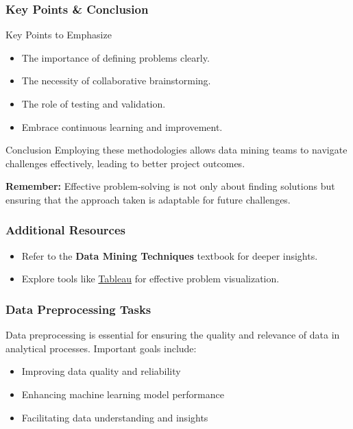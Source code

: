 \documentclass{beamer}
\begin{document}
\begin{frame}[fragile]
    \frametitle{Key Points & Conclusion}
    \begin{block}{Key Points to Emphasize}
        \begin{itemize}
            \item The importance of defining problems clearly.
            \item The necessity of collaborative brainstorming.
            \item The role of testing and validation.
            \item Embrace continuous learning and improvement.
        \end{itemize}
    \end{block}

    \begin{block}{Conclusion}
        Employing these methodologies allows data mining teams to navigate challenges effectively, leading to better project outcomes.
        
        \textbf{Remember:} Effective problem-solving is not only about finding solutions but ensuring that the approach taken is adaptable for future challenges.
    \end{block}
\end{frame}

\begin{frame}[fragile]
    \frametitle{Additional Resources}
    \begin{itemize}
        \item Refer to the \textbf{Data Mining Techniques} textbook for deeper insights.
        \item Explore tools like \href{https://www.tableau.com/}{Tableau} for effective problem visualization.
    \end{itemize}
\end{frame}

\begin{frame}[fragile]
    \frametitle{Data Preprocessing Tasks}
    Data preprocessing is essential for ensuring the quality and relevance of data in analytical processes. 
    Important goals include:
    \begin{itemize}
        \item Improving data quality and reliability
        \item Enhancing machine learning model performance
        \item Facilitating data understanding and insights
    \end{itemize}
\end{frame}
\end{document}
